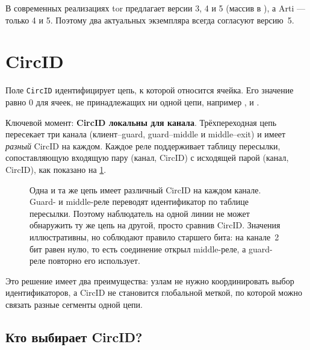 В современных реализациях tor предлагает версии 3, 4 и 5 (массив  в ), а Arti --- только 4 и 5. Поэтому два актуальных экземпляра всегда согласуют версию~5.

\section{CircID}\label{sec:circid}

Поле \texttt{CircID} идентифицирует цепь, к которой относится ячейка. Его значение равно 0 для ячеек, не принадлежащих ни одной цепи, например ,  и .

Ключевой момент: \textbf{CircID локальны для канала}. Трёхпереходная цепь пересекает три канала (клиент--guard, guard--middle и middle--exit) и имеет \emph{разный} CircID на каждом. Каждое реле поддерживает таблицу пересылки, сопоставляющую входящую пару (канал, CircID) с исходящей парой (канал, CircID), как показано на \cref{fig:circid-locale}.

\begin{figure}[htbp]
\centering

\caption{Одна и та же цепь имеет различный CircID на каждом канале. Guard- и middle-реле переводят идентификатор по таблице пересылки. Поэтому наблюдатель на одной линии не может обнаружить ту же цепь на другой, просто сравнив CircID. Значения иллюстративны, но соблюдают правило старшего бита: на канале~2 бит равен нулю, то есть соединение открыл middle-реле, а guard-реле повторно его использует.}
\label{fig:circid-locale}
\end{figure}

Это решение имеет два преимущества: узлам не нужно координировать выбор идентификаторов, а CircID не становится глобальной меткой, по которой можно связать разные сегменты одной цепи.

\subsection{Кто выбирает CircID?}

